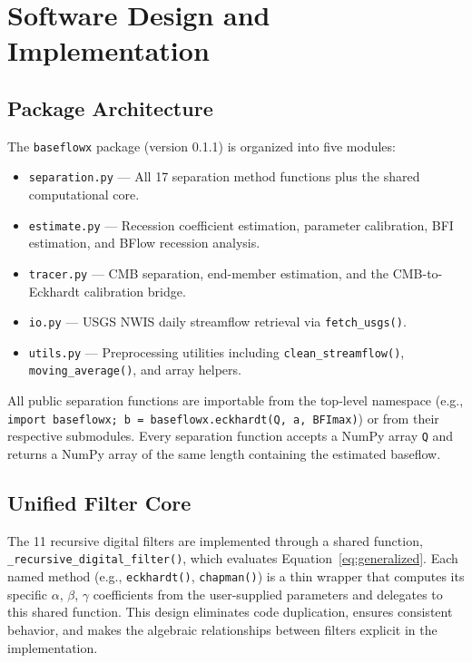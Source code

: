 \documentclass[hydrology,article,submit,pdftex,moreauthors]{Definitions/mdpi}
\begin{document}
\section{Software Design and Implementation}
\label{sec:design}

\subsection{Package Architecture}
\label{sec:architecture}

The \texttt{baseflowx} package (version 0.1.1) is organized into five modules:

\begin{itemize}[nosep]
\item \texttt{separation.py} --- All 17 separation method functions plus the shared computational core.
\item \texttt{estimate.py} --- Recession coefficient estimation, parameter calibration, BFI estimation, and BFlow recession analysis.
\item \texttt{tracer.py} --- CMB separation, end-member estimation, and the CMB-to-Eckhardt calibration bridge.
\item \texttt{io.py} --- USGS NWIS daily streamflow retrieval via \texttt{fetch\_usgs()}.
\item \texttt{utils.py} --- Preprocessing utilities including \texttt{clean\_streamflow()}, \texttt{moving\_average()}, and array helpers.
\end{itemize}

All public separation functions are importable from the top-level namespace (e.g., \texttt{import baseflowx; b = baseflowx.eckhardt(Q, a, BFImax)}) or from their respective submodules. Every separation function accepts a NumPy array \texttt{Q} and returns a NumPy array of the same length containing the estimated baseflow.

\subsection{Unified Filter Core}
\label{sec:filter_core}

The 11 recursive digital filters are implemented through a shared function, \texttt{\_recursive\_digital\_filter()}, which evaluates Equation~\ref{eq:generalized}. Each named method (e.g., \texttt{eckhardt()}, \texttt{chapman()}) is a thin wrapper that computes its specific $\alpha$, $\beta$, $\gamma$ coefficients from the user-supplied parameters and delegates to this shared function. This design eliminates code duplication, ensures consistent behavior, and makes the algebraic relationships between filters explicit in the implementation.
\end{document}
